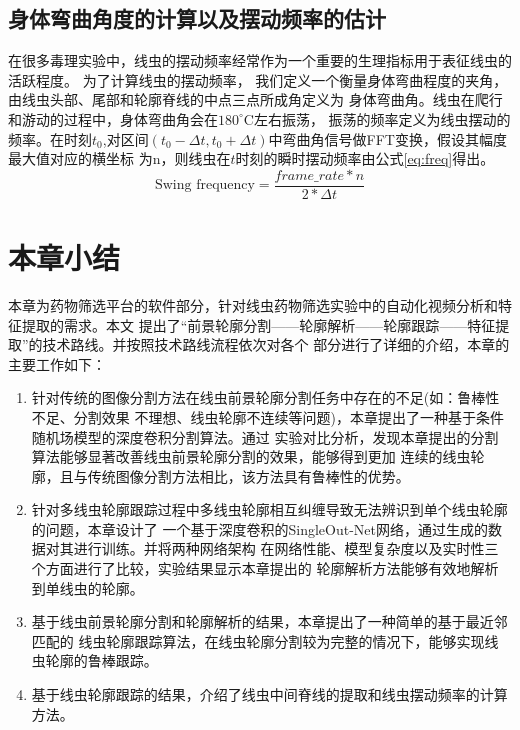 \subsection{身体弯曲角度的计算以及摆动频率的估计}
	在很多毒理实验中，线虫的摆动频率经常作为一个重要的生理指标用于表征线虫的活跃程度\cite{Wang2008Assessment}。
	为了计算线虫的摆动频率， 我们定义一个衡量身体弯曲程度的夹角，由线虫头部、尾部和轮廓脊线的中点三点所成角定义为
	身体弯曲角。线虫在爬行和游动的过程中，身体弯曲角会在$180^\circ$C左右振荡，
	振荡的频率定义为线虫摆动的频率。在时刻$t_0$,对区间$(t_0-\Delta t,t_0+\Delta t)$中弯曲角信号做FFT变换，假设其幅度最大值对应的横坐标
	为n，则线虫在$t$时刻的瞬时摆动频率由公式\ref{eq:freq}得出。
	\begin{equation}
        \text{Swing frequency}=\frac{frame\_rate*n}{2*\Delta t} \label{eq:freq}
	\end{equation}
		
\section{本章小结}
	本章为药物筛选平台的软件部分，针对线虫药物筛选实验中的自动化视频分析和特征提取的需求。本文
	提出了“前景轮廓分割——轮廓解析——轮廓跟踪——特征提取”的技术路线。并按照技术路线流程依次对各个
	部分进行了详细的介绍，本章的主要工作如下：
	\begin{enumerate}[label={(\arabic*)},font={\color{black!50!black}\bfseries}]
	  \item 针对传统的图像分割方法在线虫前景轮廓分割任务中存在的不足(如：鲁棒性不足、分割效果
	  不理想、线虫轮廓不连续等问题)，本章提出了一种基于条件随机场模型的深度卷积分割算法。通过
	  实验对比分析，发现本章提出的分割算法能够显著改善线虫前景轮廓分割的效果，能够得到更加
	  连续的线虫轮廓，且与传统图像分割方法相比，该方法具有鲁棒性的优势。
	  \item 针对多线虫轮廓跟踪过程中多线虫轮廓相互纠缠导致无法辨识到单个线虫轮廓的问题，本章设计了
	  一个基于深度卷积的SingleOut-Net网络，通过生成的数据对其进行训练。并将两种网络架构
	  在网络性能、模型复杂度以及实时性三个方面进行了比较，实验结果显示本章提出的
	  轮廓解析方法能够有效地解析到单线虫的轮廓。
	  \item 基于线虫前景轮廓分割和轮廓解析的结果，本章提出了一种简单的基于最近邻匹配的
	  线虫轮廓跟踪算法，在线虫轮廓分割较为完整的情况下，能够实现线虫轮廓的鲁棒跟踪。
	  \item 基于线虫轮廓跟踪的结果，介绍了线虫中间脊线的提取和线虫摆动频率的计算方法。
	\end{enumerate}